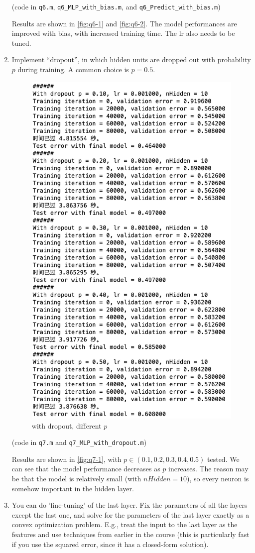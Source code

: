 \documentclass[10pt]{article}
\begin{document}
\begin{enumerate}
(code in \texttt{q6.m}, \texttt{q6\_MLP\_with\_bias.m}, and \texttt{q6\_Predict\_with\_bias.m})

Results are shown in \autoref{fig:q6-1} and \autoref{fig:q6-2}. The model performances are improved with bias, with increased training time. The lr also needs to be tuned.

\item Implement ``dropout'', in which hidden units are dropped out with probability $p$ during training. A common choice is $p = 0.5$.

\begin{figure}[htbp]
  \centering
  \includegraphics[width=0.5\linewidth]{figures/q7-1.png}
  \caption{with dropout, different $p$}
  \label{fig:q7-1}
\end{figure}

(code in \texttt{q7.m} and \texttt{q7\_MLP\_with\_dropout.m})

Results are shown in \autoref{fig:q7-1}, with $p\in(0.1,0.2,0.3,0.4,0.5)$ tested. We can see that the model performance decreases as $p$ increases. The reason may be that the model is relatively small (with $nHidden=10$), so every neuron is somehow important in the hidden layer. 

\item You can do 'fine-tuning' of the last layer. Fix the parameters of all the layers except the last one, and solve for the parameters of the last layer exactly as a convex optimization problem. E.g., treat the input to the last layer as the features and use techniques from earlier in the course (this is particularly fast if you use the squared error, since it has a closed-form solution).


\end{enumerate}
\end{document}

